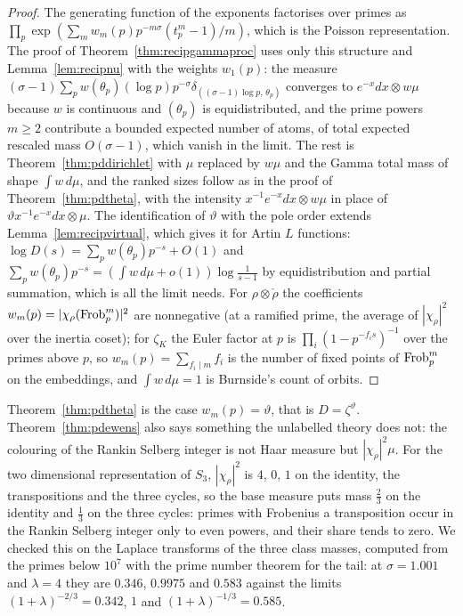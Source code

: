 \begin{proof}
The generating function of the exponents factorises over primes as $\prod_p\exp(\sum_mw_m(p)p^{-m\sigma}(t_p^m-1)/m)$, which is the Poisson representation. The proof of Theorem~\ref{thm:recipgammaproc} uses only this structure and Lemma~\ref{lem:recipnu} with the weights $w_1(p)$: the measure $(\sigma-1)\sum_pw(\theta_p)(\log p)p^{-\sigma}\delta_{((\sigma-1)\log p,\,\theta_p)}$ converges to $e^{-x}dx\otimes w\mu$ because $w$ is continuous and $(\theta_p)$ is equidistributed, and the prime powers $m\ge2$ contribute a bounded expected number of atoms, of total expected rescaled mass $O(\sigma-1)$, which vanish in the limit. The rest is Theorem~\ref{thm:pddirichlet} with $\mu$ replaced by $w\mu$ and the Gamma total mass of shape $\int w\,d\mu$, and the ranked sizes follow as in the proof of Theorem~\ref{thm:pdtheta}, with the intensity $x^{-1}e^{-x}dx\otimes w\mu$ in place of $\vartheta x^{-1}e^{-x}dx\otimes\mu$. The identification of $\vartheta$ with the pole order extends Lemma~\ref{lem:recipvirtual}, which gives it for Artin $L$ functions: $\log D(s)=\sum_pw(\theta_p)p^{-s}+O(1)$ and $\sum_pw(\theta_p)p^{-s}=(\int w\,d\mu+o(1))\log\frac1{s-1}$ by equidistribution and partial summation, which is all the limit needs. For $\rho\otimes\check\rho$ the coefficients $w_m(p)=|\chi_\rho(\operatorname{Frob}_p^m)|^2$ are nonnegative (at a ramified prime, the average of $|\chi_\rho|^2$ over the inertia coset); for $\zeta_K$ the Euler factor at $p$ is $\prod_i(1-p^{-f_is})^{-1}$ over the primes above $p$, so $w_m(p)=\sum_{f_i\mid m}f_i$ is the number of fixed points of $\operatorname{Frob}_p^m$ on the embeddings, and $\int w\,d\mu=1$ is Burnside's count of orbits.
\end{proof}

Theorem~\ref{thm:pdtheta} is the case $w_m(p)=\vartheta$, that is $D=\zeta^\vartheta$. Theorem~\ref{thm:pdewens} also says something the unlabelled theory does not: the colouring of the Rankin Selberg integer is not Haar measure but $|\chi_\rho|^2\mu$. For the two dimensional representation of $S_3$, $|\chi_\rho|^2$ is $4$, $0$, $1$ on the identity, the transpositions and the three cycles, so the base measure puts mass $\frac23$ on the identity and $\frac13$ on the three cycles: primes with Frobenius a transposition occur in the Rankin Selberg integer only to even powers, and their share tends to zero. We checked this on the Laplace transforms of the three class masses, computed from the primes below $10^7$ with the prime number theorem for the tail: at $\sigma=1.001$ and $\lambda=4$ they are $0.346$, $0.9975$ and $0.583$ against the limits $(1+\lambda)^{-2/3}=0.342$, $1$ and $(1+\lambda)^{-1/3}=0.585$.

